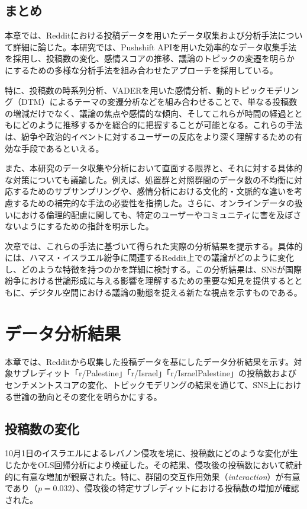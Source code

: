\documentclass[11pt, a4j]{jreport}
\begin{document}
    \section{まとめ}
    本章では、Redditにおける投稿データを用いたデータ収集および分析手法について詳細に論じた。本研究では、Pushshift APIを用いた効率的なデータ収集手法を採用し、投稿数の変化、感情スコアの推移、議論のトピックの変遷を明らかにするための多様な分析手法を組み合わせたアプローチを採用している。

    特に、投稿数の時系列分析、VADERを用いた感情分析、動的トピックモデリング（DTM）によるテーマの変遷分析などを組み合わせることで、単なる投稿数の増減だけでなく、議論の焦点や感情的な傾向、そしてこれらが時間の経過とともにどのように推移するかを総合的に把握することが可能となる。これらの手法は、紛争や政治的イベントに対するユーザーの反応をより深く理解するための有効な手段であるといえる。

    また、本研究のデータ収集や分析において直面する限界と、それに対する具体的な対策についても議論した。例えば、処置群と対照群間のデータ数の不均衡に対応するためのサブサンプリングや、感情分析における文化的・文脈的な違いを考慮するための補完的な手法の必要性を指摘した。さらに、オンラインデータの扱いにおける倫理的配慮に関しても、特定のユーザーやコミュニティに害を及ぼさないようにするための指針を明示した。

    次章では、これらの手法に基づいて得られた実際の分析結果を提示する。具体的には、ハマス・イスラエル紛争に関連するReddit上での議論がどのように変化し、どのような特徴を持つのかを詳細に検討する。この分析結果は、SNSが国際紛争における世論形成に与える影響を理解するための重要な知見を提供するとともに、デジタル空間における議論の動態を捉える新たな視点を示すものである。

    \chapter{データ分析結果}
    本章では、Redditから収集した投稿データを基にしたデータ分析結果を示す。対象サブレディット「r/Palestine」「r/Israel」「r/IsraelPalestine」の投稿数およびセンチメントスコアの変化、トピックモデリングの結果を通じて、SNS上における世論の動向とその変化を明らかにする。

    \section{投稿数の変化}
    10月1日のイスラエルによるレバノン侵攻を境に、投稿数にどのような変化が生じたかをOLS回帰分析により検証した。その結果、侵攻後の投稿数において統計的に有意な増加が観察された。特に、群間の交互作用効果（\textit{interaction}）が有意であり（$p = 0.032$）、侵攻後の特定サブレディットにおける投稿数の増加が確認された。
\end{document}
